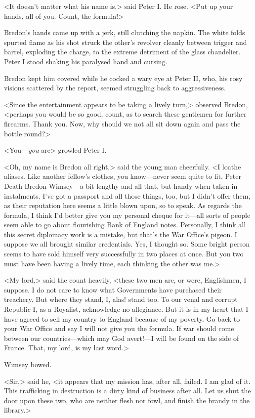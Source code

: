 <It doesn't matter what his name is,> said Peter I. He rose. <Put up your hands, all of you. Count, the formula!>

Bredon's hands came up with a jerk, still clutching the napkin. The white folds spurted flame as his shot struck the other's revolver cleanly between trigger and barrel, exploding the charge, to the extreme detriment of the glass chandelier. Peter I stood shaking his paralysed hand and cursing.

Bredon kept him covered while he cocked a wary eye at Peter II, who, his rosy visions scattered by the report, seemed struggling back to aggressiveness.

<Since the entertainment appears to be taking a lively turn,> observed Bredon, <perhaps you would be so good, count, as to search these gentlemen for further firearms. Thank you. Now, why should we not all sit down again and pass the bottle round?>

<You—\textit{you} are\longdash> growled Peter I.

<Oh, my name is Bredon all right,> said the young man cheerfully. <I loathe aliases. Like another fellow's clothes, you know—never seem quite to fit. Peter Death Bredon Wimsey—a bit lengthy and all that, but handy when taken in instalments. I've got a passport and all those things, too, but I didn't offer them, as their reputation here seems a little blown upon, so to speak. As regards the formula, I think I'd better give you my personal cheque for it—all sorts of people seem able to go about flourishing Bank of England notes. Personally, I think all this secret diplomacy work is a mistake, but that's the War Office's pigeon. I suppose we all brought similar credentials. Yes, I thought so. Some bright person seems to have sold himself very successfully in two places at once. But you two must have been having a lively time, each thinking the other was me.>

<My lord,> said the count heavily, <these two men are, or were, Englishmen, I suppose. I do not care to know what Governments have purchased their treachery. But where they stand, I, alas! stand too. To our venal and corrupt Republic I, as a Royalist, acknowledge no allegiance. But it is in my heart that I have agreed to sell my country to England because of my poverty. Go back to your War Office and say I will not give you the formula. If war should come between our countries—which may God avert!—I will be found on the side of France. That, my lord, is my last word.>

Wimsey bowed.

<Sir,> said he, <it appears that my mission has, after all, failed. I am glad of it. This trafficking in destruction is a dirty kind of business after all. Let us shut the door upon these two, who are neither flesh nor fowl, and finish the brandy in the library.>